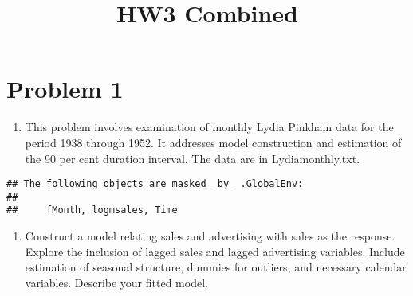 \documentclass[
]{article}
\title{HW3 Combined}
\author{}
\date{\vspace{-2.5em}}
\newenvironment{Shaded}{\begin{snugshade}}{\end{snugshade}}
\newcommand{\DecValTok}[1]{\textcolor[rgb]{0.00,0.00,0.81}{#1}}
\newcommand{\FunctionTok}[1]{\textcolor[rgb]{0.00,0.00,0.00}{#1}}
\newcommand{\NormalTok}[1]{#1}
\newcommand{\OtherTok}[1]{\textcolor[rgb]{0.56,0.35,0.01}{#1}}
\newcommand{\SpecialCharTok}[1]{\textcolor[rgb]{0.00,0.00,0.00}{#1}}
\newcommand{\StringTok}[1]{\textcolor[rgb]{0.31,0.60,0.02}{#1}}
\providecommand{\tightlist}{%
  \setlength{\itemsep}{0pt}\setlength{\parskip}{0pt}}
\begin{document}
\maketitle

\hypertarget{problem-1}{%
\section{Problem 1}\label{problem-1}}

\begin{enumerate}
\def\labelenumi{\arabic{enumi}.}
\tightlist
\item
  This problem involves examination of monthly Lydia Pinkham data for
  the period 1938 through 1952. It addresses model construction and
  estimation of the 90 per cent duration interval. The data are in
  Lydiamonthly.txt.
\end{enumerate}

\begin{Shaded}
\end{Shaded}

\begin{verbatim}
## The following objects are masked _by_ .GlobalEnv:
## 
##     fMonth, logmsales, Time
\end{verbatim}

\begin{enumerate}
\def\labelenumi{(\alph{enumi})}
\tightlist
\item
  Construct a model relating sales and advertising with sales as the
  response. Explore the inclusion of lagged sales and lagged advertising
  variables. Include estimation of seasonal structure, dummies for
  outliers, and necessary calendar variables. Describe your fitted
  model.
\end{enumerate}
\end{document}
